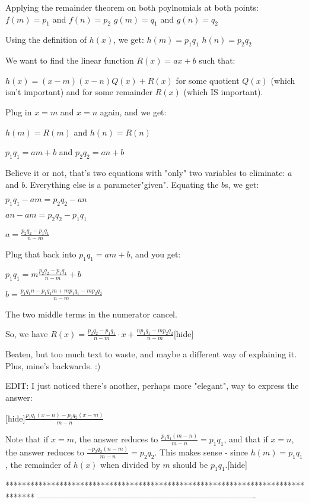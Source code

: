 \begin{solution}Applying the remainder theorem on both poylnomials at both points:
$f(m) = p_1$ and $f(n) = p_2$
$g(m) = q_1$ and $g(n) = q_2$

Using the definition of $h(x)$, we get:
$h(m) = p_1q_1$
$h(n) = p_2q_2$

We want to find the linear function $R(x) = ax + b$ such that:

$h(x) = (x-m)(x-n)Q(x) + R(x)$ for some quotient $Q(x)$ (which isn't important) and for some remainder $R(x)$ (which IS important).

Plug in $x=m$ and $x=n$ again, and we get:

$h(m) = R(m)$ and $h(n) = R(n)$

$p_1q_1 = am + b$ and $p_2q_2 = an + b$

Believe it or not, that's two equations with "only" two variables to eliminate:  $a$ and $b$.  Everything else is a parameter\/"given".  Equating the $b$s, we get:

$p_1q_1 - am = p_2q_2 - an$

$an - am = p_2q_2 - p_1q_1$

$a = \frac{p_2q_2 - p_1q_1}{n-m}$

Plug that back into $p_1q_1 = am + b$, and you get:

$p_1q_1 = m\frac{p_2q_2 - p_1q_1}{n-m} + b$

$b =  \frac{p_1q_1n - p_1q_1m + mp_1q_1 - mp_2q_2}{n-m}$

The two middle terms in the numerator cancel.  

So, we  have $R(x) = \boxed{\frac{p_2q_2 - p_1q_1}{n-m} \cdot x + \frac{np_1q_1 - mp_2q_2}{n-m}}$[\/hide]

Beaten, but too much text to waste, and maybe a different way of explaining it.  Plus, mine's backwards. :)

EDIT:  I just noticed there's another, perhaps more "elegant", way to express the answer:

[hide]$\frac{p_1q_1(x-n) - p_2q_2(x-m)}{m-n}$

Note that if $x=m$, the answer reduces to ${\frac{p_1q_1(m-n)}{m-n}} = p_1q_1$, and that if $x=n$, the answer reduces to $\frac{-p_2q_2(n-m)}{m-n} = p_2q_2$.  This makes sense - since $h(m) = p_1q_1$, the remainder of $h(x)$ when divided by $m$ should be $p_1q_1$.[\/hide]
\end{solution}
*******************************************************************************
-------------------------------------------------------------------------------

